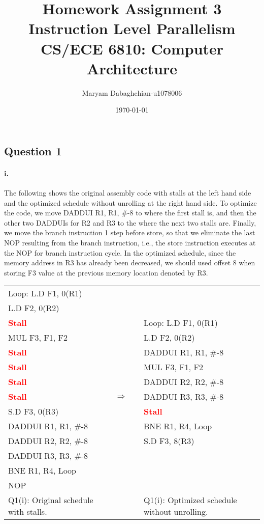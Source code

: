\documentclass[11pt]{article}
\title{Homework Assignment 3\\
	Instruction Level Parallelism\\
	CS/ECE 6810: Computer Architecture}
\author{Maryam Dabaghchian-u1078006}
\date{\today}
\newcommand{\q}[1]{\subsection*{Question {#1}}}
\renewcommand{\part}[1]{\paragraph*{{#1}.}}
\newcommand{\code}[1]{\textsf{#1}}
\newcommand{\stall}{\textcolor{red}{\textbf{Stall}}}
\begin{document}
\maketitle

\q{1} 

\part{i} The following shows the original assembly code with stalls at the left hand side and the optimized schedule without unrolling at the right hand side. 
To optimize the code, we move \code{DADDUI R1, R1, \#-8} to where the first stall is, and then the other two \code{DADDUI}s for \code{R2} and \code{R3} to the where the next two stalls are. Finally, we move the branch instruction 1 step before store, so that we eliminate the last \code{NOP} resulting from the branch instruction, i.e., the store instruction executes at the \code{NOP} for branch instruction cycle. In the optimized schedule, since the memory address in \code{R3} has already been decreased, we should used offset 8 when storing \code{F3} value at the previous memory location denoted by \code{R3}.

\begin{table}[h]
\center
\small
\begin{tabular}{lcccl}
	 \code{Loop:} \code{L.D F1, 0(R1)} & & & &  \\
	 \code{L.D F2, 0(R2)}  & & & & \\
	 \stall &  & & &  \code{Loop:} \code{L.D F1, 0(R1)} \\
	 \code{MUL F3, F1, F2}  & & & & \code{L.D F2, 0(R2)} \\
	 \stall &  & & & \code{DADDUI R1, R1, \#-8} \\
	 \stall & & & & \code{MUL F3, F1, F2}  \\
	 \stall & & & & \code{DADDUI R2, R2, \#-8}  \\
	 \stall & & $\Rightarrow$ & & \code{DADDUI R3, R3, \#-8}  \\
	 \code{S.D F3, 0(R3)} & & & & \stall  \\
	 \code{DADDUI R1, R1, \#-8} & & & &  \code{BNE R1, R4, Loop} \\
	 \code{DADDUI R2, R2, \#-8} & & & &  \code{S.D F3, 8(R3)} \\
	 \code{DADDUI R3, R3, \#-8} & & & &   \\
	 \code{BNE R1, R4, Loop} & & & &  \\
	 \code{NOP} & & & &  \\
	 Q1(i): Original schedule with stalls. & & & & Q1(i): Optimized schedule without unrolling.
\end{tabular}
\label{tbl:q1p1}
\end{table}
\end{document}

